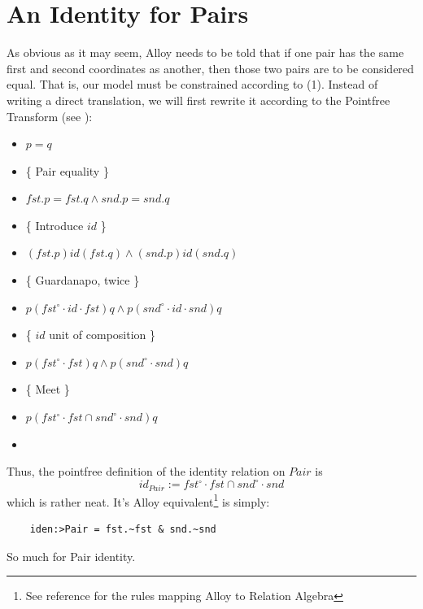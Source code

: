 \documentclass{article}
\begin{document}
\section{An Identity for Pairs}
As obvious as it may seem, Alloy needs to be told that if one pair has the same first and second coordinates as another, then those two pairs are to be considered equal.  That is, our model must be constrained according to (1).  Instead of writing a direct translation, we will first rewrite it according to the Pointfree Transform (see \cite{Oliveira2009}):
\begin{itemize}
    \item $p = q$
    \item[$\equiv$] \{ Pair equality \}
    \item[] $fst.p = fst.q \wedge snd.p = snd.q$
    \item[$\equiv$] \{ Introduce $id$ \}
    \item[] $(fst.p) \mathrel{id} (fst.q) \wedge (snd.p) \mathrel{id}
    (snd.q)$
    \item[$\equiv$] \{ Guardanapo, twice \}
    \item[] $p (fst^{\circ} \cdot \mathrel{id} \cdot fst) q \wedge p (snd^{\circ} \cdot \mathrel{id} \cdot snd) q$
    \item[$\equiv$] \{ $id$ unit of composition \}
    \item[] $p (fst^{\circ} \cdot fst) q \wedge p (snd^{\circ} \cdot snd)
    q$
    \item[$\equiv$] \{ Meet \}
    \item[] $p (fst^{\circ} \cdot fst \cap snd^{\circ} \cdot snd)
    q$
    \item[\Heart]
\end{itemize}
Thus, the pointfree definition of the identity relation on $Pair$ is
\begin{equation}
    id_{Pair} := fst^{\circ} \cdot fst \cap snd^{\circ} \cdot snd
\end{equation}
which is rather neat.  It's Alloy equivalent\footnote{See reference \cite{6155724} for the rules mapping Alloy to Relation Algebra} is simply:
\begin{verbatim}
    iden:>Pair = fst.~fst & snd.~snd
\end{verbatim}
So much for Pair identity.
\end{document}
